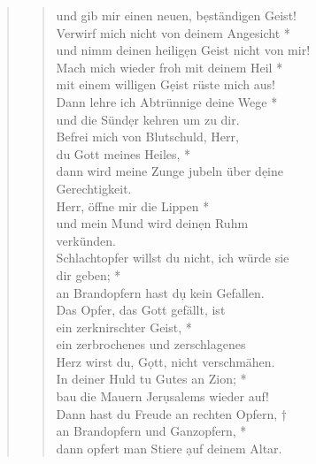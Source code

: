 \begin{quote}
\begin{verse}
und gib mir einen neuen, b\d eständigen Geist! \\
\vin Verwirf mich nicht von deinem Angesicht *\\
\vin und nimm deinen heilig\d en Geist nicht von mir! \\
Mach mich wieder froh mit deinem Heil *\\
mit einem willigen G\d eist rüste mich aus!\\
\vin Dann lehre ich Abtrünnige deine Wege *\\
\vin und die Sünd\d er kehren um zu dir.\\
Befrei mich von Blutschuld, Herr,\\ du Gott meines Heiles, *\\
dann wird meine Zunge jubeln über d\d eine \\Gerechtigkeit.\\
\vin Herr, öffne mir die Lippen *\\
\vin und mein Mund wird dein\d en Ruhm \\ \vin verkünden.\\
Schlachtopfer willst du nicht, ich würde sie\\ dir geben; *\\
an Brandopfern hast d\d u kein Gefallen. \\
\vin Das Opfer, das Gott gefällt, ist \\ \vin ein zerknirschter Geist, *\\
\vin ein zerbrochenes und zerschlagenes\\ \vin  Herz wirst du, G\d ott, nicht verschmähen.\\ 
In deiner Huld tu Gutes an Zion; *\\
bau die Mauern Jer\d usalems wieder auf! \\
\vin Dann hast du Freude an rechten Opfern, †\\
\vin an Brandopfern und Ganzopfern, *\\ \vin dann opfert man Stiere \d auf deinem Altar. \\

\end{verse}
\end{quote}


\vspace{0.cm}
\def\greinitialformat#1{{\fontsize{40}{40}\selectfont #1}}
\gresetfirstlineaboveinitial{\small \textcolor{red}{Ps 92}}{}
\setaboveinitialseparation{0.72mm}

